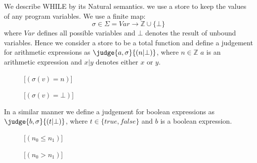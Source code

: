 We describe WHILE by its Natural semantics.
we use a store to keep the values of any program variables. We use a finite map:
$$\sigma \in \Sigma = Var \longrightarrow \mathbb{Z} \cup \{\bot\}$$
where $Var$ defines all possible variables and $\bot$ denotes the result of unbound variables.
Hence we consider a store to be a total function and define a judgement for arithmetic expressions as
$\judge{a,\sigma}{(n | \bot)}$, where $n \in \mathbb{Z}$ $a$ is an arithmetic expression and $x | y$ denotes either $x$ or $y$.

\begin{figure}[h!]
\inference[ACst]{}
{}

\inference[Var]{}
{}[$(\sigma(v) = n)$]

{}[$( \sigma(v) = \bot )$]

{}

{}

{}
\end{figure}

In a similar manner we define a judgement for boolean expressions as $\judge{b,\sigma}{(t | \bot)}$, where $t \in \{true, false\}$ and $b$ is a boolean expression.

\begin{figure}[h!]
\inference[BCst]{}
{}

{}[$(n_0 \leq n_1)$]

{}[$(n_0 > n_1)$]

{}

{}

{}

{}

{}

\end{figure}

